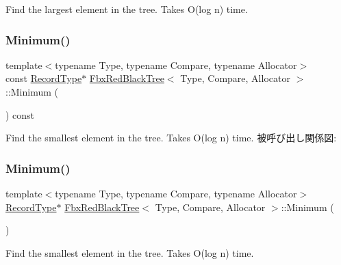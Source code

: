 Find the largest element in the tree. Takes O(log n) time. \mbox{\label{class_fbx_red_black_tree_a9a4565bfb7656d449804fca9a8e56fa1}} 
\subsubsection{\texorpdfstring{Minimum()}{Minimum()}\hspace{0.1cm}{\footnotesize\ttfamily [1/2]}}
{\footnotesize\ttfamily template$<$typename Type, typename Compare, typename Allocator$>$ \\
const \hyperlink{class_fbx_red_black_tree_1_1_record_type}{Record\+Type}$\ast$ \hyperlink{class_fbx_red_black_tree}{Fbx\+Red\+Black\+Tree}$<$ Type, Compare, Allocator $>$\+::Minimum (\begin{DoxyParamCaption}{ }\end{DoxyParamCaption}) const}

Find the smallest element in the tree. Takes O(log n) time. 被呼び出し関係図\+:
\mbox{\label{class_fbx_red_black_tree_abc02bb7015d4966b5bba54f5e29120da}} 
\subsubsection{\texorpdfstring{Minimum()}{Minimum()}\hspace{0.1cm}{\footnotesize\ttfamily [2/2]}}
{\footnotesize\ttfamily template$<$typename Type, typename Compare, typename Allocator$>$ \\
\hyperlink{class_fbx_red_black_tree_1_1_record_type}{Record\+Type}$\ast$ \hyperlink{class_fbx_red_black_tree}{Fbx\+Red\+Black\+Tree}$<$ Type, Compare, Allocator $>$\+::Minimum (\begin{DoxyParamCaption}{ }\end{DoxyParamCaption})}

Find the smallest element in the tree. Takes O(log n) time. \mbox{\label{class_fbx_red_black_tree_aad39327aec57c013f40b53e5613ecb5b}} 
